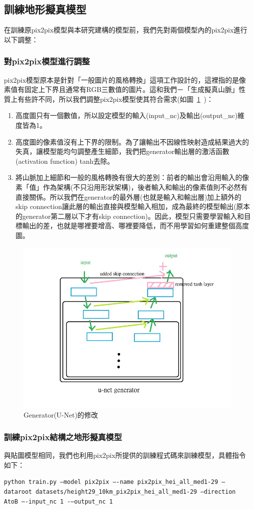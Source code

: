 \documentclass[a4paper, 12pt]{article}
\begin{document}
\subsection{訓練地形擬真模型}
在訓練原pix2pix模型與本研究建構的模型前，我們先對兩個模型內的pix2pix進行以下調整：
\subsubsection{對pix2pix模型進行調整}
pix2pix模型原本是針對「一般圖片的風格轉換」這項工作設計的，這裡指的是像素值有固定上下界且通常有RGB三數值的圖片。這和我們－「生成擬真山脈」性質上有些許不同，所以我們調整pix2pix模型使其符合需求(如圖~\ref{fig:13}~)：
\begin{enumerate}
    \item 高度圖只有一個數值，所以設定模型的輸入(input\_nc)及輸出(output\_nc)維度皆為1。
    \item 高度圖的像素值沒有上下界的限制。為了讓輸出不因線性映射造成結果過大的失真，讓模型能均勻調整產生細節，我們把generator輸出層的激活函數(activation function) tanh去除。
    \item 將山脈加上細節和一般的風格轉換有很大的差別：前者的輸出會沿用輸入的像素「值」作為架構(不只沿用形狀架構)，後者輸入和輸出的像素值則不必然有直接關係。所以我們在generator的最外層(也就是輸入和輸出層)加上額外的skip connection讓此層的輸出直接與模型輸入相加，成為最終的模型輸出(原本的generator第二層以下才有skip connection)。因此，模型只需要學習輸入和目標輸出的差，也就是哪裡要增高、哪裡要降低，而不用學習如何重建整個高度圖。
\end{enumerate}
\begin{figure}[htbp]
    \centering
    \includegraphics[width=0.6\linewidth]{fig/13.jpg}
    \caption{Generator(U-Net)的修改}
    \label{fig:13}
\end{figure}
\subsubsection{訓練pix2pix結構之地形擬真模型}
與貼圖模型相同，我們也利用pix2pix所提供的訓練程式碼來訓練模型，具體指令如下：
\begin{center}
\texttt{\small python train.py --model pix2pix –-name pix2pix\_hei\_all\_med1-29 --dataroot datasets/height29\_10km\_pix2pix\_hei\_all\_med1-29 --direction AtoB –-input\_nc 1 -–output\_nc 1}
\end{center}
\end{document}
